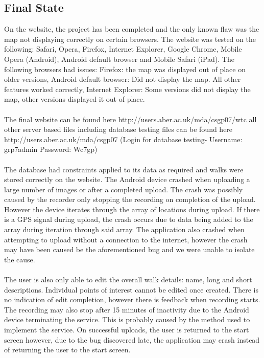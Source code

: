 \documentclass[12pt]{article}
\begin{document}
\subsection{Final State}
On the website, the project has been completed and the only known flaw was the map not displaying correctly on certain browsers. The website was tested on the following: Safari, Opera, Firefox, Internet Explorer, Google Chrome, Mobile Opera (Android), Android default browser and Mobile Safari (iPad). The following browsers had issues:\- Firefox: the map was displayed out of place on older versions, Android default browser: Did not display the map. All other features worked correctly, Internet Explorer: Some versions did not display the map, other versions displayed it out of place.
\\\\
The final website can be found here http://users.aber.ac.uk/mda/csgp07/wtc 
\newline
all other server based files including database testing files can be found here
\newline
http://users.aber.ac.uk/mda/csgp07 
\newline
(Login for database testing- Username: grp7admin Password: Wc7gp)
\\\\
The database had constraints applied to its data as required and walks were stored correctly on the website. The Android device crashed when uploading a large number of images or after a completed upload. The crash was possibly caused by the recorder only stopping the recording on completion of the upload. However the device iterates through the array of locations during upload. If there is a GPS signal during upload, the crash occurs due to data being added to the array during iteration through said array. The application also crashed when attempting to upload without a connection to the internet, however the crash may have been caused be the aforementioned bug and we were unable to isolate the cause.
\\\\
The user is also only able to edit the overall walk details: name, long and short descriptions. Individual points of interest cannot be edited once created. There is no indication of edit completion, however there is feedback when recording starts. The recording may also stop after 15 minutes of inactivity due to the Android device terminating the service. This is probably caused by the method used to implement the service. On successful uploads, the user is returned to the start screen however, due to the bug discovered late, the application may crash instead of returning the user to the start screen. 
\end{document}
